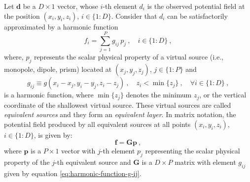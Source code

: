 %
%
%

Let $\mathbf{d}$ be a $D \times 1$ vector, whose $i$-th element $d_{i}$ is the observed potential
field at the position $(x_{i}, y_{i}, z_{i})$, $i \in \{1:D\}$.
Consider that $d_{i}$ can be satisfactorily approximated by a harmonic function
\begin{equation}
	f_{i} = \sum\limits_{j = 1}^{P} g_{ij} \, p_{j} \: ,
	\quad i \in \{1:D\} \: ,
	\label{eq:predicted-data-f-i}
\end{equation}
where, $p_{j}$ represents the scalar physical property of a virtual source (i.e., monopole, dipole, prism) located
at $(x_{j}, y_{j}, z_{j})$, $j \in \{1:P\}$ and 
\begin{equation}
	g_{ij} \equiv g(x_{i} - x_{j}, y_{i} - y_{j}, z_{i} - z_{j}) \: ,
	\quad z_{i} < \min\{z_{j}\} \: , \quad \forall i \in \{1:D\} \: ,
	\label{eq:harmonic-function-g-ij}
\end{equation}
is a harmonic function, where $\min\{z_{j}\}$ denotes the minimum $z_{j}$, or the vertical coordinate of the 
shallowest virtual source.
These virtual sources are called \textit{equivalent sources} and they form an \textit{equivalent layer}.
In matrix notation, the potential field produced by all equivalent sources at all points 
$(x_{i}, y_{i}, z_{i})$, $i \in \{1:D\}$, is given by:
\begin{equation}
	\mathbf{f} = \mathbf{G} \mathbf{p} \: ,
	\label{eq:predicted-data-vector}
\end{equation}
where $\mathbf{p}$ is a $P \times 1$ vector with $j$-th element $p_{j}$ representing the scalar physical property
of the $j$-th equivalent source 
and $\mathbf{G}$ is a $D \times P$ matrix with element $g_{ij}$ given by equation \ref{eq:harmonic-function-g-ij}. 

